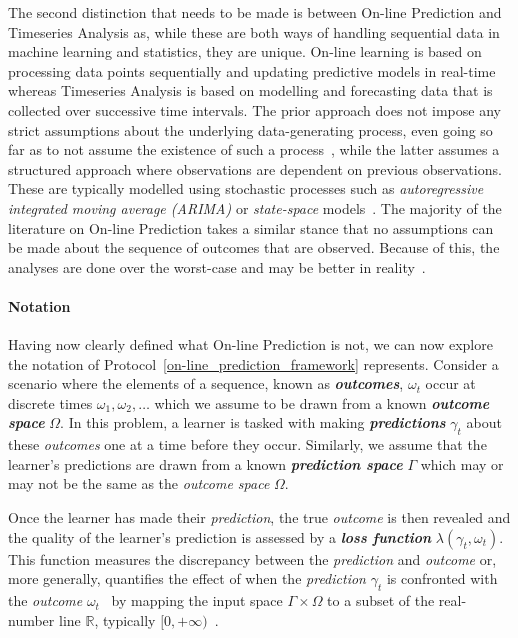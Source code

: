 The second distinction that needs to be made is between On-line Prediction and Timeseries Analysis as, while these are both ways of handling sequential data in machine learning and statistics, they are unique. On-line learning is based on processing data points sequentially and updating predictive models in real-time whereas Timeseries Analysis is based on modelling and forecasting data that is collected over successive time intervals. The prior approach does not impose any strict assumptions about the underlying data-generating process, even going so far as to not assume the existence of such a process~\cite{vovk:2001}, while the latter assumes a structured approach where observations are dependent on previous observations. These are typically modelled using stochastic processes such as \textit{autoregressive integrated moving average (ARIMA)} or \textit{state-space} models~\cite{box:2015}. The majority of the literature on On-line Prediction takes a similar stance that no assumptions can be made about the sequence of outcomes that are observed. Because of this, the analyses are done over the worst-case and may be better in reality~\cite{cesa-bianchi:1997}.

\paragraph{Notation}
Having now clearly defined what On-line Prediction is not, we can now explore the notation of Protocol~\ref{on-line_prediction_framework} represents. Consider a scenario where the elements of a sequence, known as \textit{\textbf{outcomes}}, $\omega_t$ occur at discrete times $\omega_1, \omega_2, \ldots$ which we assume to be drawn from a known \textit{\textbf{outcome space}} $\Omega$. In this problem, a learner is tasked with making \textit{\textbf{predictions}} $\gamma_t$ about these \textit{outcomes} one at a time before they occur. Similarly, we assume that the learner's predictions are drawn from a known \textit{\textbf{prediction space}} $\Gamma$ which may or may not be the same as the \textit{outcome space} $\Omega$.

Once the learner has made their \textit{prediction}, the true \textit{outcome} is then revealed and the quality of the learner's prediction is assessed by a \textit{\textbf{loss function}} $\lambda(\gamma_t, \omega_t)$. This function measures the discrepancy between the \textit{prediction} and \textit{outcome} or, more generally, quantifies the effect of when the \textit{prediction} $\gamma_t$ is confronted with the \textit{outcome} $\omega_t$~\cite{adamskiy:2019} by mapping the input space $\Gamma \times \Omega$ to a subset of the real-number line $\mathbb{R}$, typically $[0, +\infty)$~\cite{kalnishkan:2009}.

